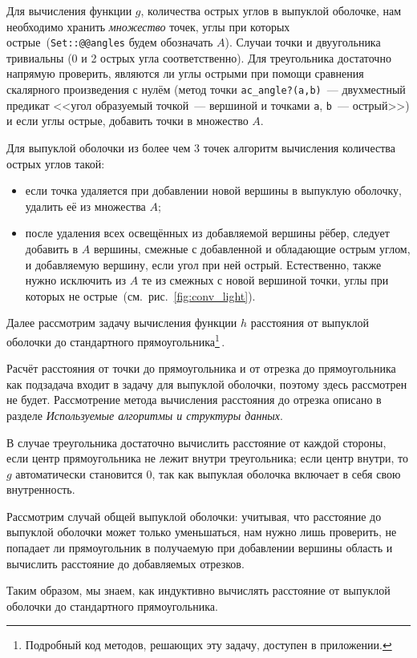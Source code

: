 \newpage

Для вычисления функции $g$, количества острых углов в выпуклой оболочке, нам необходимо хранить \emph{множество} точек, углы при которых острые~(\verb|Set::@@angles| будем обозначать $A$). Случаи точки и двуугольника тривиальны (0 и 2 острых угла соответственно). Для треугольника достаточно напрямую проверить, являются ли углы острыми при помощи сравнения скалярного произведения с нулём (метод точки \verb|ac_angle?(a,b)|~--- двухместный предикат <<угол образуемый точкой~--- вершиной и точками \verb|a|, \verb|b|~--- острый>>) и если углы острые, добавить точки в множество $A$.

Для выпуклой оболочки из более чем 3 точек алгоритм вычисления количества острых углов такой: 
\begin{itemize}
\item если точка удаляется при добавлении новой вершины в выпуклую оболочку, удалить её из множества $A$;
\item после удаления всех освещённых из добавляемой вершины рёбер, следует добавить в $A$ вершины, смежные с добавленной и обладающие острым углом, и добавляемую вершину, если угол при ней острый. Естественно, также нужно исключить из $A$ те из смежных с новой вершиной точки, углы при которых не острые~(см.~рис.~\ref{fig:conv_light}).
\end{itemize}

Далее рассмотрим задачу вычисления функции $h$ расстояния от выпуклой оболочки до стандартного прямоугольника\footnote{Подробный код методов, решающих эту задачу, доступен в приложении.}\,.

Расчёт расстояния от точки до прямоугольника и от отрезка до прямоугольника как подзадача входит в задачу для выпуклой оболочки, поэтому здесь рассмотрен не будет. Рассмотрение метода вычисления расстояния до отрезка описано в разделе \emph{Используемые алгоритмы и структуры данных}. 

В случае треугольника достаточно вычислить расстояние от каждой стороны, если центр прямоугольника
 не лежит внутри треугольника; если центр внутри, то $g$ автоматически становится $0$, так как 
 выпуклая оболочка включает в себя свою внутренность.

Рассмотрим случай общей выпуклой оболочки:
учитывая, что расстояние до выпуклой оболочки может только уменьшаться, нам нужно лишь проверить, не попадает ли прямоугольник в получаемую при добавлении вершины область и вычислить расстояние до добавляемых отрезков.

Таким образом, мы знаем, как индуктивно вычислять расстояние от выпуклой оболочки до стандартного прямоугольника.

